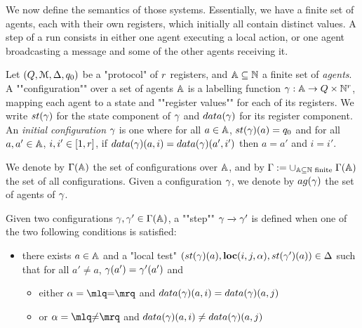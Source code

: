 We now define the semantics of those systems. Essentially, we have a finite set of agents, each with their own registers, which initially all contain distinct values. A step of a run consists in either one agent executing a local action, or one agent broadcasting a message and some of the other agents receiving it.

\begin{definition}[Semantics]
	Let $(Q,\mathcal{M}, \Delta, q_0)$ be a "protocol" of $r$ registers, and $\mathbb{A} \subseteq \mathbb{N}$ a finite set of \emph{agents}.
	A ""configuration"" over a set of agents $\mathbb{A}$ is a labelling function $\gamma : \mathbb{A} \to Q \times \mathbb{N}^{r}$, mapping each agent to a state and ""register values"" for each of its registers. 
	We write $\st{\config}$ for the state component of $\gamma$ and $\data{\config}$ for its register component.
	An \emph{initial configuration} $\gamma$ is one where for all $a \in \mathbb{A}$, $\st{\config}(a) = q_0$ and for all $a, a' \in \mathbb{A}$, $i, i' \in [1,r]$, if $\data{\config}(a, i) = \data{\config}(a', i')$ then $a=a'$ and $i=i'$.
	
	\AP We denote by $\Gamma(\mathbb{A})$ the set of configurations over $\mathbb{A}$, and by $\Gamma := \cup_{\mathbb{A} \subseteq \mathbb{N} \text{ finite }} \Gamma(\mathbb{A})$ the set of all configurations. Given a configuration $\gamma$, we denote by $\agentsof{\config}$ the set of agents of $\gamma$.
	
	\AP Given two configurations $\gamma, \gamma' \in \Gamma(\mathbb{A})$, a ""step"" $\gamma \xrightarrow{} \gamma'$ is defined when one of the two following conditions is satisfied:
	\begin{itemize}
		\item there exists $a \in \mathbb{A}$ and a "local test" $(\st{\config}(a), \loc{i}{j}{\anact}, \st{\config'}(a)) \in \transitions$ such that for all $a'\neq a$, $\gamma(a') = \gamma'(a')$ and
		\begin{itemize}
			\item either $\anact = \quotemarks{\eqtestact}$ and $\data{\config}(a,i) = \data{\config}(a,j)$
			
			\item or $\anact = \quotemarks{\diseqtestact}$ and $\data{\config}(a,i) \neq \data{\config}(a,j)$
		\end{itemize}
		

\end{itemize}
\end{definition}
